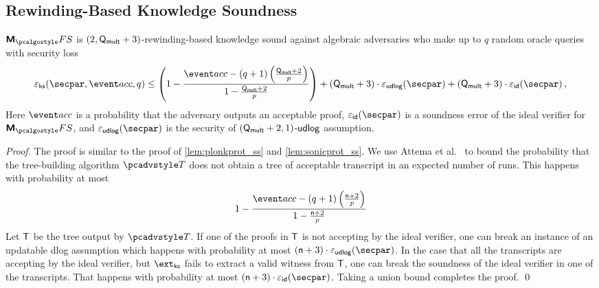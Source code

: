 \subsection{Rewinding-Based Knowledge Soundness}
\begin{lemma}
	\label{lem:marlinprot_ss}
	$\marlinprotfs$ is $(2, \mathsf{Q_{mult}} + 3)$-rewinding-based knowledge sound against algebraic adversaries who make up to $q$ random oracle queries with security loss 
	\[
	\epscss(\secpar,\accProb, q) \leq \left(1 - \frac{\accProb - (q + 1) \left( \frac{\multconstr + 2}{p}\right)}{1 - \frac{\multconstr + 2}{p}}\right) + (\multconstr + 3)\cdot\epsudlog (\secpar) + (\multconstr + 3) \cdot \epsid (\secpar)\,,
	\]
	Here $\accProb$ is a probability that the adversary outputs an acceptable proof, $\epsid(\secpar)$ is a soundness error of the ideal verifier for $\marlinprotfs$, and $\epsudlog(\secpar)$ is the security of $(\mathsf{Q_{mult}} + 2, 1)$-$\mathsf{udlog}$ assumption.
\end{lemma}
\begin{proof}
The proof is similar to the proof of \cref{lem:plonkprot_ss} and \cref{lem:sonicprot_ss}. 
We use Attema et al.~\cite[Proposition 2]{EPRINT:AttFehKlo21} to bound the probability that the tree-building algorithm $\tdv$ does not obtain a tree of acceptable transcript in an expected number of runs. This happens with probability at most
\[
1 - \frac{\accProb - (q + 1) \left(\frac{ \noofc + 2}{p} \right)}{1 - \frac{\noofc + 2}{p}}
\]
Let $\mathsf{T}$ be the tree output by $\tdv$. If one of the proofs in $\mathsf{T}$ is not accepting by the ideal verifier, one can break an instance of an updatable dlog assumption which happens with probability at most $(\noofc + 3)  \cdot \epsudlog (\secpar)$. In the case that all the transcripts are accepting by the ideal verifier, but $\extss$ fails to extract a valid witness from $\mathsf{T}$, one can break the soundness of the ideal verifier in one of the transcripts. That happens with probability at most $(\noofc + 3) \cdot \epsid (\secpar)$. Taking a union bound completes the proof.
\qed
\end{proof}


